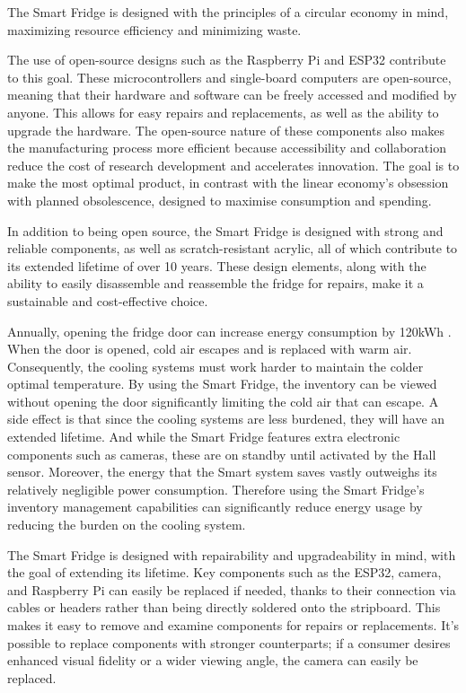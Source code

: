 The Smart Fridge is designed with the principles of a circular economy in mind, maximizing resource efficiency and minimizing waste.

The use of open-source designs such as the Raspberry Pi and ESP32 contribute to this goal.
These microcontrollers and single-board computers are open-source, meaning that their hardware and software can be freely accessed and modified by anyone.
This allows for easy repairs and replacements, as well as the ability to upgrade the hardware.
The open-source nature of these components also makes the manufacturing process more efficient because accessibility and collaboration reduce the cost of research development and accelerates innovation.
The goal is to make the most optimal product, in contrast with the linear economy's obsession with planned obsolescence, designed to maximise consumption and spending.

In addition to being open source, the Smart Fridge is designed with strong and reliable components, as well as scratch-resistant acrylic, all of which contribute to its extended lifetime of over 10 years.
These design elements, along with the ability to easily disassemble and reassemble the fridge for repairs, make it a sustainable and cost-effective choice.

Annually, opening the fridge door can increase energy consumption by 120kWh \cite{energy}.
When the door is opened, cold air escapes and is replaced with warm air.
Consequently, the cooling systems must work harder to maintain the colder optimal temperature.
By using the Smart Fridge, the inventory can be viewed without opening the door significantly limiting the cold air that can escape.
A side effect is that since the cooling systems are less burdened, they will have an extended lifetime.
And while the Smart Fridge features extra electronic components such as cameras, these are on standby until activated by the Hall sensor.
Moreover, the energy that the Smart system saves vastly outweighs its relatively negligible power consumption.
Therefore using the Smart Fridge's inventory management capabilities can significantly reduce energy usage by reducing the burden on the cooling system.

The Smart Fridge is designed with repairability and upgradeability in mind, with the goal of extending its lifetime.
Key components such as the ESP32, camera,  and Raspberry Pi can easily be replaced if needed, thanks to their connection via cables or headers rather than being directly soldered onto the stripboard.
This makes it easy to remove and examine components for repairs or replacements.
It's possible to replace components with stronger counterparts; if a consumer desires enhanced visual fidelity or a wider viewing angle, the camera can easily be replaced.

